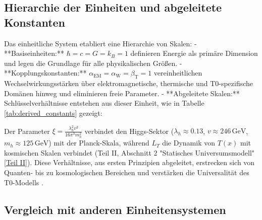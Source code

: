 \documentclass[12pt,a4paper]{article}
\newcommand{\Tfield}{T(x)}
\newcommand{\alphaEM}{\alpha_{\text{EM}}}
\newcommand{\alphaW}{\alpha_{\text{W}}}
\newcommand{\betaT}{\beta_{\text{T}}}
\begin{document}
	\subsection{Hierarchie der Einheiten und abgeleitete Konstanten}
	\label{subsec:hierarchy}
	
	Das einheitliche System etabliert eine Hierarchie von Skalen:
	- **Basiseinheiten:** \(\hbar = c = G = k_B = 1\) definieren Energie als primäre Dimension und legen die Grundlage für alle physikalischen Größen.
	- **Kopplungskonstanten:** \(\alphaEM = \alphaW = \betaT = 1\) vereinheitlichen Wechselwirkungsstärken über elektromagnetische, thermische und T0-spezifische Domänen hinweg und eliminieren freie Parameter.
	- **Abgeleitete Skalen:** Schlüsselverhältnisse entstehen aus dieser Einheit, wie in Tabelle \ref{tab:derived_constants} gezeigt:
	\begin{table}[ht]
		\centering
		\caption{Abgeleitete Konstanten im T0-Modell, die Skalenhierarchien repräsentieren.}
		\label{tab:derived_constants}
	\end{table}
	
	Der Parameter \(\xi = \frac{\lambda_h^2 v^2}{16\pi^3 m_h^2}\) verbindet den Higgs-Sektor (\(\lambda_h \approx 0.13\), \(v \approx 246 \, \text{GeV}\), \(m_h \approx 125 \, \text{GeV}\)) mit der Planck-Skala, während \(L_T\) die Dynamik von \(\Tfield\) mit kosmischen Skalen verbindet (Teil II, Abschnitt 2 "Statisches Universumsmodell" \href{https://github.com/jpascher/T0-Time-Mass-Duality/tree/main/2/pdf/Deutsch/QMRelTimeMassPart2.pdf}{[Teil II]}). Diese Verhältnisse, aus ersten Prinzipien abgeleitet, erstrecken sich von Quanten- bis zu kosmologischen Bereichen und verstärken die Universalität des T0-Modells \cite{pascher_alphabeta_2025}.
	
	\subsection{Vergleich mit anderen Einheitensystemen}
	\label{subsec:unit_comparison}
	
\end{document}
